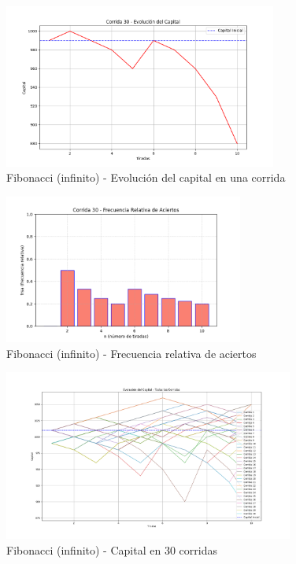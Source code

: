 \documentclass{article}
\begin{document}
\begin{figure}[H]
    \centering
    \includegraphics[width=0.8\textwidth]{./images/capital_corrida_30_f_i.png}
    \caption{Fibonacci (infinito) - Evolución del capital en una corrida}
\end{figure}

\begin{figure}[H]
    \centering
    \includegraphics[width=0.7\textwidth]{./images/frsa_corrida_30_f_i.png}
    \caption{Fibonacci (infinito) - Frecuencia relativa de aciertos}
\end{figure}

\begin{figure}[H]
    \centering
    \includegraphics[width=0.85\textwidth]{./images/capital_todas_corridas_f_i.png}
    \caption{Fibonacci (infinito) - Capital en 30 corridas}
\end{figure}
\end{document}
